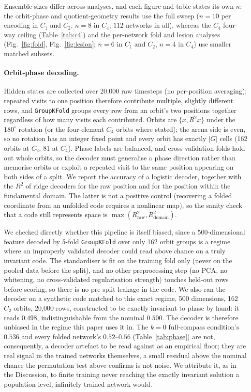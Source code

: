 Ensemble sizes differ across analyses, and each figure and table states its own $n$: the orbit-phase
and quotient-geometry results use the full sweep ($n=10$ per encoding in $C_1$ and $C_2$, $n=8$ in
$C_4$; $112$ networks in all), whereas the $C_4$ four-way ceiling (Table~\ref{tab:c4}) and the
per-network fold and lesion analyses (Fig.~\ref{fig:fold}, Fig.~\ref{fig:lesion}; $n=6$ in $C_1$ and
$C_2$, $n=4$ in $C_4$) use smaller matched subsets.

\paragraph{Orbit-phase decoding.} Hidden states are collected over 20{,}000 raw timesteps (no
per-position averaging); repeated visits to one position therefore contribute multiple, slightly
different rows, and \texttt{GroupKFold} groups every row from an orbit's two positions together
regardless of how many visits each contributed. Orbits are $\{x, R^2x\}$ under the $180^\circ$
rotation (or the four-element $C_4$ orbits where stated); the arena side is even, so no rotation
has an integer fixed point and every orbit has exactly $|G|$ cells (162 orbits at $C_2$, 81 at
$C_4$). Phase labels are balanced, and cross-validation folds hold out whole orbits, so the decoder
must generalise a phase direction rather than memorise orbits or exploit a repeated visit to the
same position appearing on both sides of a split. We report the accuracy of a logistic decoder,
together with the $R^2$ of ridge decoders for the raw position and for the position within the
fundamental domain. The latter is not a positive control (recovering a folded coordinate from an
unfolded code requires a nonlinear map), so the sanity check that a code still represents space is
$\max(R^2_{\text{raw}}, R^2_{\text{domain}})$.

We checked directly whether this pipeline is itself biased, since a 500-dimensional feature decoded
by 5-fold \texttt{GroupKFold} over only 162 orbit groups is a regime where an improperly validated
decoder could read above chance on a truly invariant code. The standardiser is fit on the training
fold only (never on the pooled data before the split), and no other preprocessing step (no PCA, no
whitening, no cross-validated regularisation strength) touches held-out rows before scoring, so
there is no pre-split leakage in the code. We also ran the decoder on a synthetic code matched to
this exact regime, 500 dimensions, 162 $C_2$ orbits, 20{,}000 rows, constructed to be exactly
invariant to phase by hand: it reads $0.498$, indistinguishable from the nominal $0.500$. The
decoder is therefore unbiased in the regime this paper uses it in. The $k{=}0$ full-compass
condition's $0.536$ and every folded network's $0.52$--$0.56$ (Table~\ref{tab:phase}) are not,
consequently, a decoder artefact to be read against as an empirical floor; they are real signal in
the trained networks themselves, a small residual above the nominal chance the permutation test
above confirms is not noise. We attribute it, as in the Discussion, to finite training never
reaching the exactly invariant solution a population-level, infinitely-trained network would.

